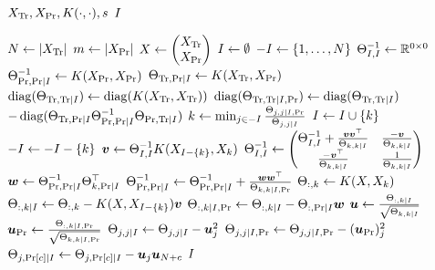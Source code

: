 \begin{algorithmic}[1]
  \REQUIRE \( X_{\text{Tr}}, X_{\text{Pr}}, K(\cdot, \cdot), s \)
  \ENSURE \( I \)

  \STATE \( N \gets \lvert X_{\text{Tr}}\rvert \)
  \STATE \( m \gets \lvert X_{\text{Pr}}\rvert \)
  \STATE \(
    X \gets
    \begin{pmatrix}
      X_{\text{Tr}} \\
      X_{\text{Pr}}
    \end{pmatrix}
  \)
  \STATE \( I \gets \emptyset \)
  \STATE \( -I \gets \{ 1, \dotsc, N \} \)
  \STATE \( \Theta_{I, I}^{-1} \gets \mathbb{R}^{0 \times 0} \)
  \STATE \(
    \Theta_{\text{Pr}, \text{Pr} \mid I}^{-1} \gets
    K(X_{\text{Pr}}, X_{\text{Pr}})
  \)
  \STATE \(
    \Theta_{\text{Tr}, \text{Pr} \mid I} \gets
    K(X_{\text{Tr}}, X_{\text{Pr}})
  \)
  \STATE \(
    \operatorname{diag}(\Theta_{\text{Tr}, \text{Tr} \mid I}) \gets
    \operatorname{diag}(K(X_{\text{Tr}}, X_{\text{Tr}}))
  \)
  \STATE \(
    \operatorname{diag}(\Theta_{\text{Tr}, \text{Tr} \mid I, \text{Pr}}) \gets
    \operatorname{diag}(\Theta_{\text{Tr}, \text{Tr} \mid I})
  \) \\  \(
    - \operatorname{diag}(
      \Theta_{\text{Tr}, \text{Pr} \mid I}
      \Theta_{\text{Pr}, \text{Pr} \mid I}^{-1}
      \Theta_{\text{Pr}, \text{Tr} \mid I}
    )
  \)
    \STATE \(
      k \gets \min_{j \in -I}
      \frac{\Theta_{j, j \mid I, \text{Pr}}}{\Theta_{j, j \mid I}}
    \)
    \STATE \( I \gets I \cup \{ k \} \)
    \STATE \( -I \gets -I - \{ k \} \)
    \STATE \( \bm{v} \gets \Theta_{I, I}^{-1} K(X_{I - \{ k \}}, X_k) \)
    \STATE \(
      \Theta_{I, I}^{-1} \gets
      \begin{pmatrix}
        \Theta_{I, I}^{-1} +
        \frac{\bm{v} \bm{v}^{\top}}{\Theta_{k, k \mid I}} &
        \frac{-\bm{v}}{\Theta_{k, k \mid I}} \\
        \frac{-\bm{v}^{\top}}{\Theta_{k, k \mid I}} &
        \frac{1}{\Theta_{k, k \mid I}}
      \end{pmatrix}
    \)
    \STATE \(
      \bm{w} \gets \Theta_{\text{Pr}, \text{Pr} \mid I}^{-1}
      \Theta_{k, \text{Pr} \mid I}^{\top}
    \)
    \STATE \(
      \Theta_{\text{Pr}, \text{Pr} \mid I}^{-1} \gets
      \Theta_{\text{Pr}, \text{Pr} \mid I}^{-1} +
      \frac{\bm{w} \bm{w}^{\top}}{\Theta_{k, k \mid I, \text{Pr}}}
    \)
    \STATE \( \Theta_{:, k} \gets K(X, X_k) \)
    \STATE \(
      \Theta_{:, k \mid I} \gets
      \Theta_{:, k} -
      K(X, X_{I - \{ k \}}) \bm{v}
    \)
    \STATE \(
      \Theta_{:, k \mid I, \text{Pr}} \gets
      \Theta_{:, k \mid I} -
      \Theta_{:, \text{Pr} \mid I} \bm{w}
    \)
    \STATE \(
      \bm{u} \gets
      \frac{\Theta_{:, k \mid I}}{\sqrt{\Theta_{k, k \mid I}}}
    \)
    \STATE \(
      \bm{u}_{\text{Pr}} \gets
      \frac{\Theta_{:, k \mid I, \text{Pr}}}
            {\sqrt{\Theta_{k, k \mid I, \text{Pr}}}}
    \)
      \STATE \(
        \Theta_{j, j \mid I} \gets
        \Theta_{j, j \mid I} -
        \bm{u}_j^2
      \)
      \STATE \(
        \Theta_{j, j \mid I, \text{Pr}} \gets
        \Theta_{j, j \mid I, \text{Pr}} -
        (\bm{u}_{\text{Pr}})_j^2
      \)
        \STATE \(
          \Theta_{j, \text{Pr}[c] \mid I} \gets
          \Theta_{j, \text{Pr}[c] \mid I} -
          \bm{u}_j \bm{u}_{N + c}
        \)
      \ENDFOR
    \ENDFOR
  \ENDWHILE
  \RETURN \( I \)
\end{algorithmic}
